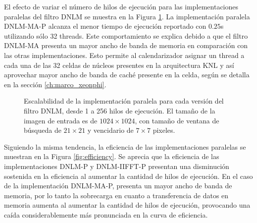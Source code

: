 El efecto de variar el n\'umero de hilos de ejecuci\'on para las implementaciones paralelas del filtro DNLM se muestra en la Figura \ref{fig:scalability}. La implementaci\'on paralela DNLM-MA-P alcanza el menor tiempo de ejecuci\'on reportado con $0.25$s utilizando s\'olo 32 threads. Este comportamiento se explica debido a que el filtro DNLM-MA presenta un mayor ancho de banda de memoria en comparaci\'on con las otras implementaciones. Esto permite al calendarizador asignar un thread a cada una de las 32 celdas de n\'ucleos presentes en la arquitectura  KNL y as\'i aprovechar mayor ancho de banda de cach\'e presente en la celda, seg\'un se detalla en la secci\'on \ref{ch:marco_xeonphi}. 







\begin{figure}
\centering
  \caption[Escalabilidad de las implementaciones paralelas del filtro DNLM]{Escalabilidad de la implementaci\'on paralela para cada versi\'on del filtro DNLM, desde 1 a 256 hilos de ejecuci\'on. El tama\~no de la imagen de entrada es de $1024\times1024$, con tama\~no de ventana de b\'usqueda de $21 \times 21$ y vencidario de $7 \times 7$ pixeles.\label{fig:scalability}}
  \end{figure}
  
  Siguiendo la misma tendencia, la eficiencia de las implementaciones paralelas se muestran en la Figura \ref{fig:efficiency}. Se aprecia que la eficiencia de las implementaciones DNLM-P y DNLM-IIFFT-P presentan una disminuci\'on sostenida en la eficiencia al aumentar la cantidad de hilos de ejecuci\'on. En el caso de la implementaci\'on DNLM-MA-P, presenta un mayor ancho de banda de memoria, por lo tanto la sobrecarga en cuanto a transferencia de datos en memoria aumenta al aumentar la cantidad de hilos de ejecuci\'on, provocando una ca\'ida considerablemente m\'as pronunciada en la curva de eficiencia.
  
